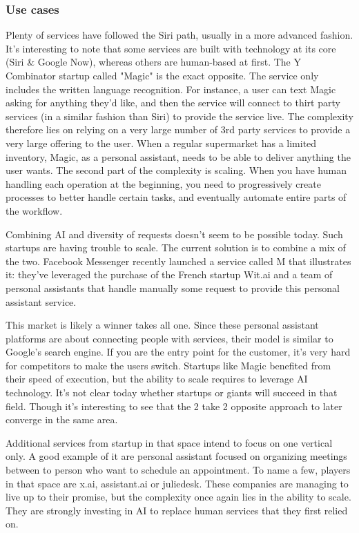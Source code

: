 \documentclass[12pt]{article}
\begin{document}
\subsubsection{Use cases}
Plenty of services have followed the Siri path, usually in a more advanced fashion. It's interesting to note that some services are built with technology at its core (Siri & Google Now), whereas others are human-based at first. The Y Combinator startup called "Magic" is the exact opposite. The service only includes the written language recognition. For instance, a user can text Magic asking for anything they'd like, and then the service will connect to thirt party services (in a similar fashion than Siri) to provide the service live. The complexity therefore lies on relying on a very large number of 3rd party services to provide a very large offering to the user. When a regular supermarket has a limited inventory, Magic, as a personal assistant, needs to be able to deliver anything the user wants. The second part of the complexity is scaling. When you have human handling each operation at the beginning, you need to progressively create processes to better handle certain tasks, and eventually automate entire parts of the workflow. 

Combining AI and diversity of requests doesn't seem to be possible today. Such startups are having trouble to scale. The current solution is to combine a mix of the two. Facebook Messenger recently launched a service called M that illustrates it: they've leveraged the purchase of the French startup Wit.ai and a team of personal assistants that handle manually some request to provide this personal assistant service. 

This market is likely a winner takes all one. Since these personal assistant platforms are about connecting people with services, their model is similar to Google's search engine. If you are the entry point for the customer, it's very hard for competitors to make the users switch. Startups like Magic benefited from their speed of execution, but the ability to scale requires to leverage AI technology. It's not clear today whether startups or giants will succeed in that field. Though it's interesting to see that the 2 take 2 opposite approach to later converge in the same area. 

Additional services from startup in that space intend to focus on one vertical only. A good example of it are personal assistant focused on organizing meetings between to person who want to schedule an appointment. To name a few, players in that space are x.ai, assistant.ai or juliedesk. These companies are managing to live up to their promise, but the complexity once again lies in the ability to scale. They are strongly investing in AI to replace human services that they first relied on. 
\end{document}
